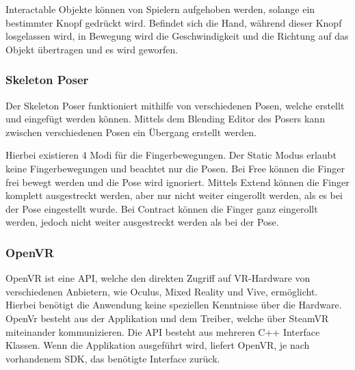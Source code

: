 \begin{itemize}
Interactable Objekte können von Spielern aufgehoben werden, solange ein bestimmter Knopf gedrückt wird.
Befindet sich die Hand, während dieser Knopf losgelassen wird, in Bewegung wird die Geschwindigkeit und die Richtung auf das Objekt übertragen und es wird geworfen.
~\cite{SteamVR_Interaction_System_2022}

\subsubsection{Skeleton Poser}
Der Skeleton Poser funktioniert mithilfe von verschiedenen Posen, welche erstellt und eingefügt werden können.
Mittels dem Blending Editor des Posers kann zwischen verschiedenen Posen ein Übergang erstellt werden.

Hierbei existieren 4 Modi für die Fingerbewegungen.
Der Static Modus erlaubt keine Fingerbewegungen und beachtet nur die Posen.
Bei Free können die Finger frei bewegt werden und die Pose wird ignoriert.
Mittels Extend können die Finger komplett ausgestreckt werden, aber nur nicht weiter eingerollt werden, als es bei der Pose eingestellt wurde.
Bei Contract können die Finger ganz eingerollt werden, jedoch nicht weiter ausgestreckt werden als bei der Pose.
~\cite{SteamVR_Skeleton_Poser_2022}

\subsubsection{OpenVR}
OpenVR ist eine API, welche den direkten Zugriff auf VR-Hardware von verschiedenen Anbietern, wie Oculus, Mixed Reality und Vive, ermöglicht.
Hierbei benötigt die Anwendung keine speziellen Kenntnisse über die Hardware.
OpenVr besteht aus der Applikation und dem Treiber, welche über SteamVR miteinander kommunizieren.
Die API besteht aus mehreren C++ Interface Klassen.
Wenn die Applikation ausgeführt wird, liefert OpenVR, je nach vorhandenem SDK, das benötigte Interface zurück.
~\cite{OpenVR_Github_Documentation_2020}


\end{itemize}
